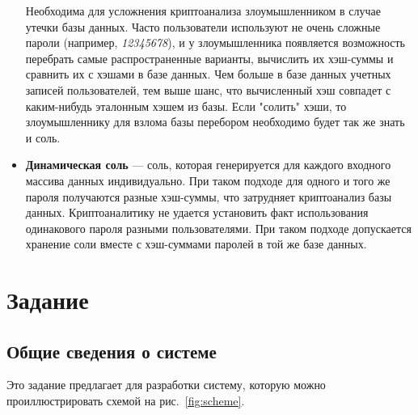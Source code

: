 \documentclass[14pt]{extarticle}
\begin{document}
\begin{itemize}
  
  Необходима для усложнения криптоанализа злоумышленником в случае утечки
  базы данных.
  Часто пользователи используют не очень сложные пароли (например,
  \textit{12345678}), и у злоумышленника появляется возможность перебрать
  самые распространенные варианты, вычислить их хэш-суммы и сравнить их с хэшами
  в базе данных\footnotemark{}.
  Чем больше в базе данных учетных записей пользователей, тем выше шанс, что
  вычисленный хэш совпадет с каким-нибудь эталонным хэшем из базы.
  Если "солить" хэши, то злоумышленнику для взлома базы перебором необходимо
  будет так же знать и соль.


 \item \textbf{Динамическая соль} --- соль, которая генерируется для каждого
  входного массива данных индивидуально.
  При таком подходе для одного и того же пароля получаются разные хэш-суммы,
  что затрудняет криптоанализ базы данных.
  Криптоаналитику не удается установить факт использования одинакового пароля
  разными пользователями.
  При таком подходе допускается хранение соли вместе с хэш-суммами паролей
  в той же базе данных.

\end{itemize}

\section{Задание}

\subsection{Общие сведения о системе}

Это задание предлагает для разработки систему, которую можно проиллюстрировать
схемой на рис.~\ref{fig:scheme}.
\end{document}

